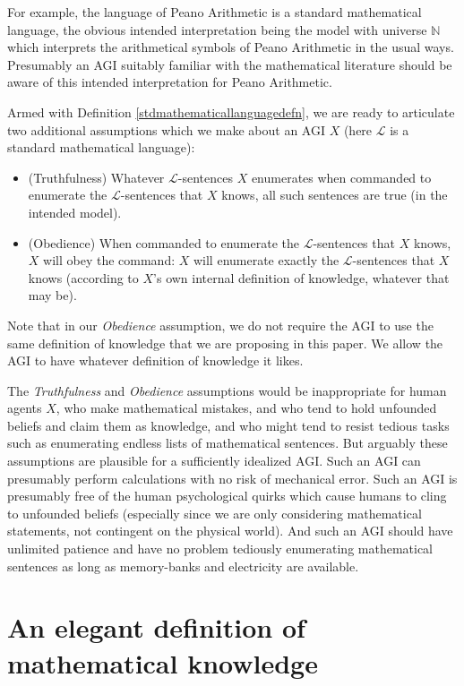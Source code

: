 \documentclass[runningheads]{llncs}
\begin{document}
For example, the
language of Peano Arithmetic is a standard mathematical language, the obvious
intended interpretation being the model with universe $\mathbb N$ which
interprets the arithmetical symbols of Peano Arithmetic in the usual ways.
Presumably an AGI suitably familiar with the mathematical literature should
be aware of this intended interpretation for Peano Arithmetic.

Armed with Definition \ref{stdmathematicallanguagedefn}, we are ready to articulate
two additional assumptions which we make about an AGI $X$
(here $\mathscr L$ is a standard mathematical language):
\begin{itemize}
  \item (Truthfulness) Whatever $\mathscr L$-sentences $X$ enumerates
  when commanded to enumerate the $\mathscr L$-sentences that $X$ knows,
  all such sentences are true (in the intended model).
  \item (Obedience) When commanded to enumerate the $\mathscr L$-sentences that $X$ knows,
  $X$ will obey the command: $X$ will enumerate exactly the
  $\mathscr L$-sentences that $X$ knows (according to $X$'s own internal definition
  of knowledge, whatever that may be).
\end{itemize}

Note that in our \emph{Obedience} assumption, we do not require the AGI to use
the same definition of knowledge that we are proposing in this paper. We allow
the AGI to have whatever definition of knowledge it likes.

The \emph{Truthfulness} and \emph{Obedience} assumptions would be inappropriate
for human agents $X$, who make mathematical
mistakes, and who tend to hold unfounded beliefs and claim them as knowledge,
and who might tend to resist tedious tasks such as enumerating endless lists of
mathematical sentences. But arguably these assumptions are plausible for a
sufficiently idealized AGI. Such an AGI can presumably perform calculations with
no risk of mechanical error. Such an AGI is presumably free of the human
psychological quirks which cause humans to cling to unfounded beliefs (especially
since we are only considering mathematical statements, not contingent on
the physical world). And such an AGI should have unlimited patience and have no
problem tediously enumerating mathematical sentences as long as memory-banks
and electricity are available.


\section{An elegant definition of mathematical knowledge}
\label{mainsection}
\end{document}
